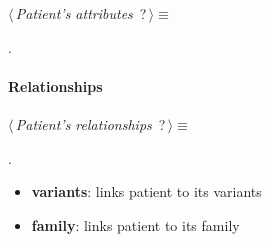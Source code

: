 	\begin{flushleft} \small
\begin{minipage}{\linewidth}\label{scrap16}\raggedright\small
{} $\langle\,${\itshape {Patient's attributes}}\nobreak\ {\footnotesize {?}}$\,\rangle\equiv$
\vspace{-1ex}
\begin{list}{}{} \item

                
        {\NWsep}
\end{list}
\vspace{-1.5ex}
\footnotesize
\begin{list}{}{\setlength{\itemsep}{-\parsep}\setlength{\itemindent}{-\leftmargin}}
\item {\NWtxtMacroNoRef}.

\item{}
\end{list}
\end{minipage}\vspace{4ex}
\end{flushleft}
\paragraph{Relationships} 

	\begin{flushleft} \small
\begin{minipage}{\linewidth}\label{scrap17}\raggedright\small
{} $\langle\,${\itshape {Patient's relationships}}\nobreak\ {\footnotesize {?}}$\,\rangle\equiv$
\vspace{-1ex}
\begin{list}{}{} \item

                
        {\NWsep}
\end{list}
\vspace{-1.5ex}
\footnotesize
\begin{list}{}{\setlength{\itemsep}{-\parsep}\setlength{\itemindent}{-\leftmargin}}
\item {\NWtxtMacroNoRef}.

\item{}
\end{list}
\end{minipage}\vspace{4ex}
\end{flushleft}
\begin{itemize}
 	\item \textbf{variants}: links patient to its variants
 	\item \textbf{family}: links patient to its family
\end{itemize}


